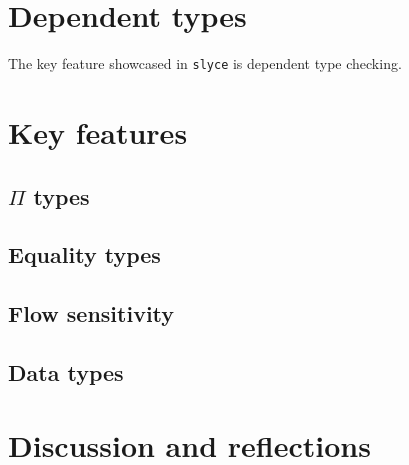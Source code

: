 



 


\section{Dependent types}
The key feature showcased in \texttt{slyce} is dependent type checking.





\section{Key features}
\subsection{$\Pi$ types}
\subsection{Equality types}\label{equal}
\subsection{Flow sensitivity}\label{flow}
\subsection{Data types}

\section{Discussion and reflections}\label{reflection}

